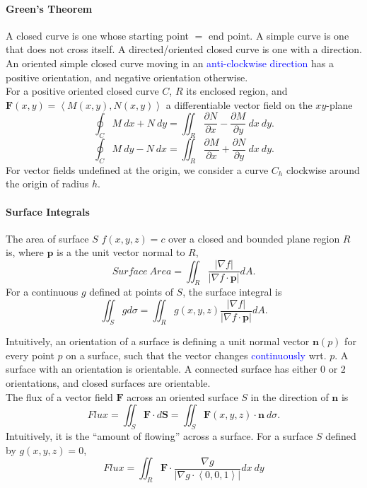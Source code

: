 \paragraph{Green's Theorem}
A \textcolor{Bittersweet}{closed curve} is one whose starting point $=$ end
point. A \textcolor{Bittersweet}{simple curve} is one that does not cross
itself. A \textcolor{Bittersweet}{directed/oriented} closed curve is one with a
direction. An oriented simple closed curve moving in an
\textcolor{Blue}{anti-clockwise direction} has a
\textcolor{Bittersweet}{positive }orientation, and negative orientation
otherwise.\\
For a positive oriented closed curve $C$, $R$ its enclosed region, and
$\mathbf{F}\left( x,y \right) =\left<M(x,y), N(x,y) \right> $ a differentiable
vector field on the $xy$-plane
\[\oint_C M\:dx+N\:dy=\iint_R \frac{\partial N}{\partial x} -\frac{\partial M}{\partial y} \:dx\:dy.\] 
\[\oint_C M\:dy-N\:dx=\iint_R \frac{\partial M}{\partial x} +\frac{\partial N}{\partial y} \:dx\:dy.\] 
For vector fields undefined at the origin, we consider a curve $C_h$ clockwise
around the origin of radius $h$. 

\paragraph{Surface Integrals}
The area of surface $S$ $f\left( x,y,z \right) =c$ over a closed and bounded
plane region $R$ is, where $\mathbf{p}$ is a the unit vector normal to $R$,
\[Surface\ Area=\iint_R \frac{\left| \nabla f \right| }{\left| \nabla f\cdot
\mathbf{p} \right| }dA.\]
For a continuous $g$ defined at points of $S$, the surface integral is
\[\iint_S g d\sigma=\iint_R g\left( x,y,z \right) \frac{\left| \nabla f \right| }{\left|
\nabla f\cdot \mathbf{p} \right| }dA.\] 

Intuitively, an \textcolor{Bittersweet}{orientation} of a surface is defining a
unit normal vector $\mathbf{n}\left( p \right) $ for every point $p$ on a
surface, such that the vector changes \textcolor{Blue}{continuously} wrt.  $p$.
A surface with an orientation is orientable. A connected surface has either $0$
or $2$ orientations, and closed surfaces are orientable.\\
The \textcolor{Bittersweet}{flux} of a vector field $\mathbf{F}$ across an
oriented surface $S$ in the direction of $\mathbf{n}$ is
\[Flux=\iint_S\mathbf{F}\cdot d\mathbf{S}=\iint_S \mathbf{F}\left( x,y,z \right) \cdot \mathbf{n}\:d\sigma.\]
Intuitively, it is the ``amount of flowing'' across a surface. For a surface $S$ defined
by $g(x,y,z)=0$, 
\[Flux=\iint_R \mathbf{F}\cdot \frac{\nabla g}{\left| \nabla g\cdot  \left<0,
0, 1 \right>  \right| }dx\:dy\] 


